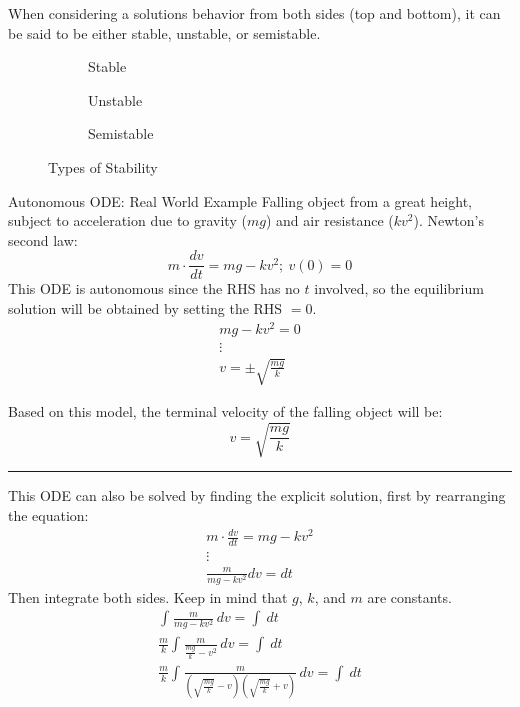 \documentclass[12pt]{article}
\begin{document}
When considering a solutions behavior from both sides (top and bottom), it can be said to be either stable, unstable, or semistable.

\begin{figure}[H]
  \centering
  \begin{subfigure}[H]{0.30\textwidth}
    \centering
    
    \caption{Stable}
    \label{fig:006}
  \end{subfigure}
  \begin{subfigure}[H]{0.30\textwidth}
    \centering
    
    \caption{Unstable}
    \label{fig:007}
  \end{subfigure}
  \begin{subfigure}[H]{0.30\textwidth}
    \centering
    
    \caption{Semistable}
    \label{fig:008}
  \end{subfigure}
  \caption{Types of Stability}
  \label{fig:typesOfStability}
\end{figure}

\begin{example}{Autonomous ODE: Real World Example}
  Falling object from a great height, subject to acceleration due to gravity ($mg$) and air resistance ($kv^2$). Newton's second law:
  \begin{equation*}
    m \cdot \frac{dv}{dt} = mg - kv^2;\ v(0) = 0
  \end{equation*}
  This ODE is autonomous since the RHS has no $t$ involved, so the equilibrium solution will be obtained by setting the RHS $= 0$.
  \begin{gather*}
    mg-kv^2 = 0 \\
    \vdots \\
    v = \pm \sqrt{\frac{mg}{k}}
  \end{gather*}

  Based on this model, the terminal velocity of the falling object will be:
  \begin{equation*}
    v = \sqrt{\frac{mg}{k}}
  \end{equation*}
  \hrule
  \vspace{12pt}
  This ODE can also be solved by finding the explicit solution, first by rearranging the equation:
  \begin{gather*}
    m \cdot \frac{dv}{dt} = mg - kv^2 \\
    \vdots \\
    \frac{m}{mg-kv^2}dv = dt
  \end{gather*}
  Then integrate both sides. Keep in mind that $g$, $k$, and $m$ are constants.
  \begin{gather*}
    \int_{}^{} \frac{m}{mg-kv^2} \,dv = \int_{}^{}  \,dt \\
    \frac{m}{k}\int_{}^{} \frac{m}{\frac{mg}{k}-v^2} \,dv = \int_{}^{}  \,dt \\
    \frac{m}{k}\int_{}^{} \frac{m}{\left(\sqrt{\frac{mg}{k}}-v\right)\left(\sqrt{\frac{mg}{k}}+v\right)} \,dv = \int_{}^{}  \,dt \\
  \end{gather*}
\end{example}
\end{document}
